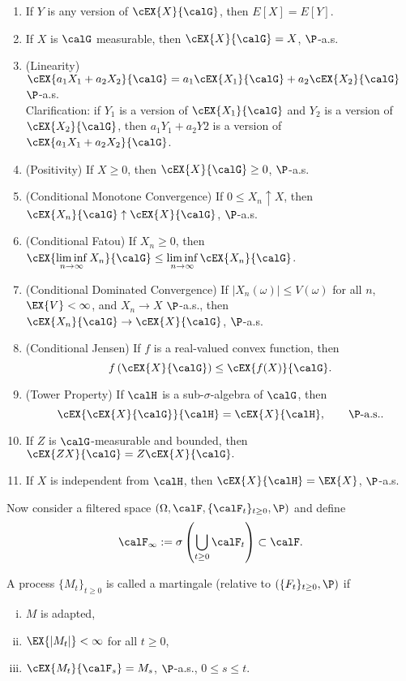 \begin{enumerate}[(E1)]
	\item
		If $Y$ is any version of $\cEX{X}{\calG}$, then $E[X]=E[Y]$.
	\item
		If $X$ is $\calG$ measurable, then $\cEX{X}{\calG} = X$, $\P$-a.s.
	\item
		(Linearity) $\cEX{a_1X_1+a_2X_2}{\calG} = a_1\cEX{X_1}{\calG} + a_2\cEX{X_2}{\calG}$ $\P$-a.s.\\
		Clarification:
			if $Y_1$ is a version of $\cEX{X_1}{\calG}$ and $Y_2$ is a version of $\cEX{X_2}{\calG}$, then
			$a_1Y_1 + a_2Y2$ is a version of $\cEX{a_1 X_1 + a_2X_2}{\calG}$.
	\item
		(Positivity) If $X \geq 0$, then $\cEX{X}{\calG} \geq 0$,  $\P$-a.s.
	\item
		(Conditional Monotone Convergence)
		If $0 \leq X_n \uparrow X$, then $\cEX{X_n}{\calG} \uparrow \cEX{X}{\calG}$, $\P$-a.s.
	\item
		(Conditional Fatou)
		If $X_n\geq 0$, then 
		$\displaystyle
			\cEX{\liminf_{n \to \infty} X_n}{\calG}
			\leq
			\liminf_{n \to \infty}
			\cEX{X_n}{\calG}
		$.
	\item
		(Conditional Dominated Convergence)
		If $|X_n(\omega)|\leq V(\omega)$ for all $n$, $\EX{V}<\infty$, and $X_n \to X$ $\P$-a.s., then
		$\cEX{X_n}{\calG} \to \cEX{X}{\calG}$, $\P$-a.s.
	\item
		(Conditional Jensen)
		If $f$ is a real-valued convex function, then
		$$
			f
			\left(
				\cEX{X}{\calG}
			\right)
			\leq
			\cEX{f(X)}{\calG}.
		$$
		\item
			(Tower Property) If $\calH$ is a sub-$\sigma$-algebra of $\calG$, then
			$$
				\cEX{\cEX{X}{\calG}}{\calH} = \cEX{X}{\calH}, \qquad \P\text{-a.s.}.
			$$
		\item
			If $Z$ is $\calG$-measurable and bounded, then
			$
				\cEX{ZX}{\calG} = Z\cEX{X}{\calG}.
			$
		\item
			If $X$ is independent from $\calH$, then
			$\cEX{X}{\calH} = \EX{X}$, \qquad $\P$-a.s.
\end{enumerate}

	Now consider a filtered space $\left(\Omega, \calF, \{\calF_t\}_{t\geq 0}, \P \right)$ and define
$$
	\calF_{\infty}:= \sigma
		\left(
			\bigcup_{t\geq 0}
			\calF_t
		\right) \subset \calF.
$$

\begin{definition}[Martingale]
	A process $\{M_t\}_{t\geq 0}$ is called a martingale (relative to $\left(\{F_t \}_{t\geq 0}, \P \right)$ if
	\begin{enumerate}[(i)]
		\item
			$M$ is adapted,
		\item
			$\EX{|M_t|}<\infty$ \qquad for all $t\geq 0$,
		\item\label{dfn:Martingale}
			$
				\cEX{M_t}{\calF_s} = M_s
			$, \qquad $\P$-a.s., \qquad $0\leq s \leq t$.
	\end{enumerate}
\end{definition}

